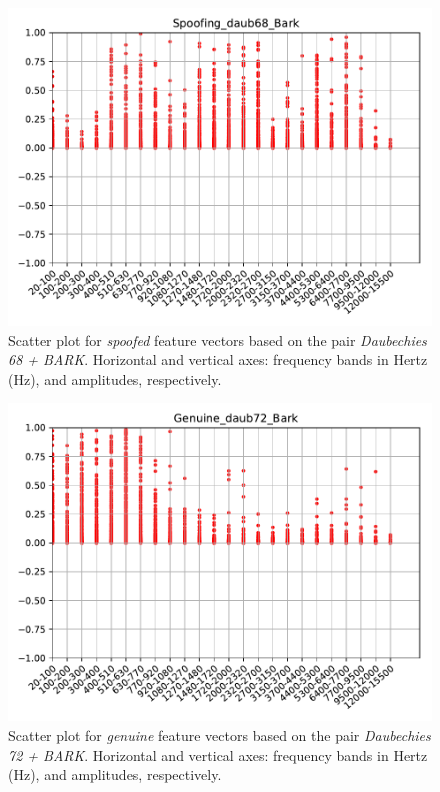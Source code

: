 		\begin{figure}[H]
			\centering
			\includegraphics[scale=.7]{images/results/barkVersusMel/Spoofing_daub68_Bark.pdf}
			\caption{Scatter plot for \textit{spoofed} feature vectors based on the pair \textit{Daubechies 68 + BARK}. Horizontal and vertical axes: frequency bands in Hertz (Hz), and amplitudes, respectively.}
			\label{fig:spoofingdaub68bark}
		\end{figure}
		\begin{figure}[H]
			\centering
			\includegraphics[scale=.7]{images/results/barkVersusMel/Genuine_daub72_Bark.pdf}
			\caption{Scatter plot for \textit{genuine} feature vectors based on the pair \textit{Daubechies 72 + BARK}. Horizontal and vertical axes: frequency bands in Hertz (Hz), and amplitudes, respectively.}
			\label{fig:livedaub72bark}
		\end{figure}
